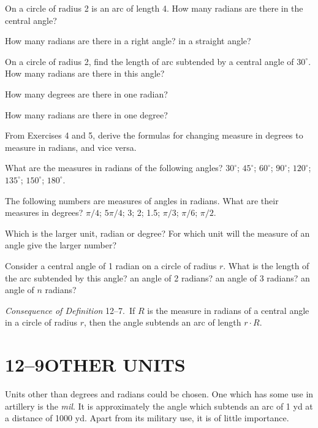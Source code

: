 \documentclass[11pt]{book}
\theoremstyle{bkplain}
\theoremstyle{XIplainnote}
\theoremstyle{bkplain}
\theoremstyle{bkplain}
\begin{document}
\begin{exercisecols}
\begin{exlist}
\item On a circle of radius 2 is an arc of length 4. How many radians are there
      in the central angle?
\item How many radians are there in a right angle? in a straight angle?
\item On a circle of radius 2, find the length of arc subtended by a central
      angle of $30^\circ$. How many radians are there in this angle?
\item How many degrees are there in one radian?
\item How many radians are there in one degree?
\item From Exercises 4 and 5, derive the formulas for changing measure in
      degrees to measure in radians, and vice versa.
\item What are the measures in radians of the following angles? $30^\circ$;
      $45^\circ$; $60^\circ$; $90^\circ$; $120^\circ$; $135^\circ$;
      $150^\circ$; $180^\circ$.
\item The following numbers are measures of angles in radians. What are their
      measures in degrees? $\pi/4$; $5\pi/4$; 3; 2; 1.5; $\pi/3$; $\pi/6$;
      $\pi/2$.
\item Which is the larger unit, radian or degree? For which unit will the
      measure of an angle give the larger number?
\item Consider a central angle of 1 radian on a circle of radius $r$. What is
      the length of the arc subtended by this angle? an angle of 2 radians? an
      angle of 3 radians? an angle of $n$ radians?
\end{exlist}
\end{exercisecols}

\par\medskip\noindent\emph{Consequence of Definition} 12--7.\ If $R$ is the
measure in radians of a central angle in a circle of radius $r$, then the angle
subtends an arc of length $r \cdot R$.\par\medskip

\section*{12--9\quad OTHER UNITS}

Units other than degrees and radians could be chosen. One which has some use in
artillery is the \emph{mil}. It is approximately the angle which subtends an arc
of 1 yd at a distance of 1000 yd. Apart from its military use, it is of little
importance.
\end{document}
